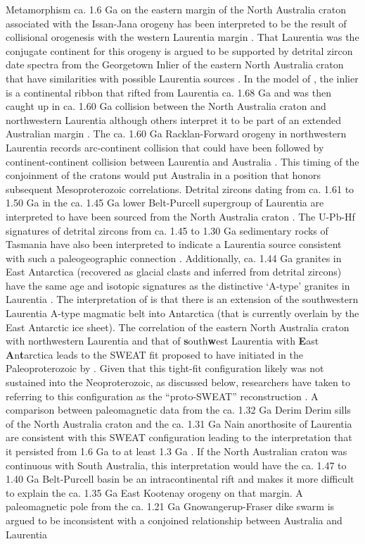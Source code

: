 \documentclass[twocolumn, switch]{article} %
\begin{document}
Metamorphism ca. 1.6 Ga on the eastern margin of the North Australia craton associated with the Issan-Jana orogeny has been interpreted to be the  result of collisional orogenesis with the western Laurentia margin \citep{Nordsvan2018a, Pourteau2018a, Gibson2020a}. That Laurentia was the conjugate continent for this orogeny is argued to be supported by detrital zircon date spectra from the Georgetown Inlier of the eastern North Australia craton that have similarities with possible Laurentia sources \citep{Nordsvan2018a}. In the model of \cite{Nordsvan2018a}, the inlier is a continental ribbon that rifted from Laurentia ca. 1.68 Ga and was then caught up in ca. 1.60 Ga collision between the North Australia craton and northwestern Laurentia although others interpret it to be part of an extended Australian margin \citep{Gibson2020a}. The ca. 1.60 Ga Racklan-Forward orogeny in northwestern Laurentia records arc-continent collision that could have been followed by continent-continent collision between Laurentia and Australia \citep{Thorkelson2005a, Furlanetto2013a}. This timing of the conjoinment of the cratons would put Australia in a position that honors subsequent Mesoproterozoic correlations. Detrital zircons dating from ca. 1.61 to 1.50 Ga in the ca. 1.45 Ga lower Belt-Purcell supergroup of Laurentia are interpreted to have been sourced from the North Australia craton \citep{Jones2015a}. The U-Pb-Hf signatures of detrital zircons from ca. 1.45 to 1.30 Ga sedimentary rocks of Tasmania have also been interpreted to indicate a Laurentia source consistent with such a paleogeographic connection \citep{Mulder2015a}. Additionally, ca. 1.44 Ga granites in East Antarctica (recovered as glacial clasts and inferred from detrital zircons) have the same age and isotopic signatures as the distinctive `A-type' granites in Laurentia \citep{Goodge2008a}. The interpretation of \cite{Goodge2008a, Goodge2017a} is that there is an extension of the southwestern Laurentia A-type magmatic belt into Antarctica (that is currently overlain by the East Antarctic ice sheet). The correlation of the eastern North Australia craton with northwestern Laurentia and that of \textbf{s}outh\textbf{w}est Laurentia with \textbf{E}ast \textbf{A}n\textbf{t}arctica leads to the SWEAT fit proposed to have initiated in the Paleoproterozoic by \cite{Moores1991a}. Given that this tight-fit configuration likely was not sustained into the Neoproterozoic, as discussed below, researchers have taken to referring to this configuration as  the ``proto-SWEAT'' reconstruction \citep{Payne2009b, Kirscher2020a}. A comparison between paleomagnetic data from the ca. 1.32 Ga Derim Derim sills of the North Australia craton and the ca. 1.31 Ga Nain anorthosite of Laurentia are consistent with this SWEAT configuration leading to the interpretation that it persisted from 1.6 Ga to at least 1.3 Ga \citep{Kirscher2020a}. If the North Australian craton was continuous with South Australia, this interpretation would have the ca. 1.47 to 1.40 Ga Belt-Purcell basin be an intracontinental rift and makes it more difficult to explain the ca. 1.35 Ga East Kootenay orogeny on that margin. A paleomagnetic pole from the ca. 1.21 Ga Gnowangerup-Fraser dike swarm is argued to be inconsistent with a conjoined relationship between Australia and Laurentia 
\end{document}
